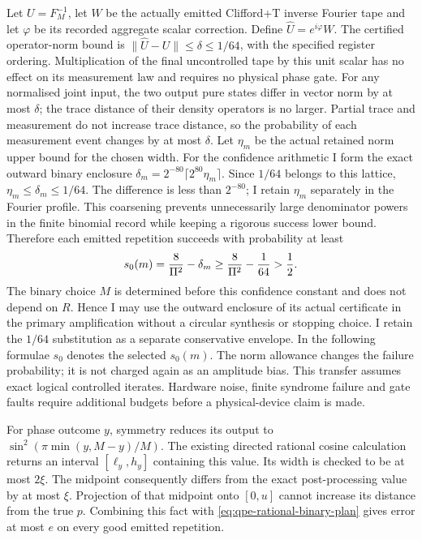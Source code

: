 Let $U=F_M^{-1}$, let $W$ be the actually emitted Clifford+T
inverse Fourier tape and let $\varphi$ be its recorded aggregate scalar
correction. Define $\widehat U=e^{i\varphi}W$. The certified operator-norm
bound is $\|\widehat U-U\|\leq\delta\leq1/64$, with the specified register
ordering. Multiplication of the final uncontrolled tape by this unit scalar
has no effect on its measurement law and requires no physical phase gate. For any normalised joint input, the
two output pure states differ in vector norm by at most $\delta$; the
trace distance of their density operators is no larger. Partial trace and
measurement do not increase trace distance, so the probability of each
measurement event changes by at most $\delta$. Let $\eta_m$ be the actual retained norm upper bound for the chosen width.
For the confidence arithmetic I form the exact outward binary enclosure
$\delta_m=2^{-80}\lceil2^{80}\eta_m\rceil$. Since $1/64$ belongs to this
lattice, $\eta_m\leq\delta_m\leq1/64$. The difference is less than
$2^{-80}$; I retain $\eta_m$ separately in the Fourier profile. This
coarsening prevents unnecessarily large denominator powers in the finite
binomial record while keeping a rigorous success lower bound. Therefore
each emitted repetition succeeds with probability at least
\begin{equation}
 s_0(m)={8\over\Pi^2}-\delta_m
 \geq {8\over\Pi^2}-{1\over64}>{1\over2}.
 \label{eq:qpe-emitted-good-probability}
\end{equation}
The binary choice $M$ is determined before this confidence constant and does
not depend on $R$. Hence I may use the outward enclosure of its actual certificate in the
primary amplification without a circular synthesis or stopping choice. I
retain the $1/64$ substitution as a separate conservative envelope. In the
following formulae $s_0$ denotes the selected $s_0(m)$.
The norm allowance changes the failure probability; it is not charged
again as an amplitude bias. This transfer assumes exact logical controlled
iterates. Hardware noise, finite syndrome failure and gate faults require
additional budgets before a physical-device claim is made.

For phase outcome $y$, symmetry reduces its output to
$\sin^2(\pi\min(y,M-y)/M)$. The existing directed rational cosine
calculation returns an interval $[\ell_y,h_y]$ containing this value. Its
width is checked to be at most $2\xi$. The midpoint consequently differs
from the exact post-processing value by at most $\xi$. Projection of that
midpoint onto $[0,u]$ cannot increase its distance from the true $p$.
Combining this fact with \eqref{eq:qpe-rational-binary-plan} gives error at
most $e$ on every good emitted repetition.

